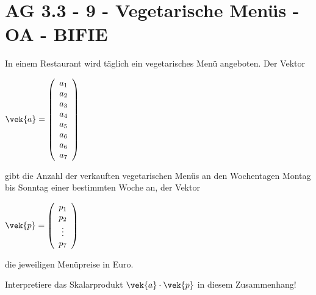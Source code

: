 \section{AG 3.3 - 9 - Vegetarische Menüs - OA - BIFIE}

\begin{beispiel}[AG 3.3]{1} %
			In einem Restaurant wird täglich ein vegetarisches Menü angeboten. Der Vektor
				
				
	\footnotesize			\begin{center}
				$\vek{a}=\left(\begin{array}{c}a_1\\ a_2\\ a_3 \\ a_4 \\ a_5 \\ a_6 \\ a_6 \\ a_7\end{array}\right)$
				\end{center}
\normalsize
				
gibt die Anzahl der verkauften vegetarischen Menüs an den Wochentagen Montag bis Sonntag einer bestimmten Woche an, der Vektor
\footnotesize	
\begin{center}
$\vek{p}=\left(\begin{array}{c}p_1\\ p_2\\ \vdots \\ p_7\end{array}\right)$
\end{center}
 \normalsize
die jeweiligen Menüpreise in Euro.

\leer

Interpretiere das Skalarprodukt $\vek{a}\cdot \vek{p}$ in diesem Zusammenhang!

\end{beispiel}